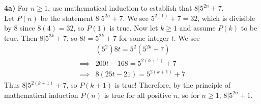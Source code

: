 \documentclass{scrartcl}
\begin{document}
\textbf{4a)} For $n\ge1$, use mathematical induction to establish that $8|5^{2n}+7$.\\

Let $P(n)$ be the statement $8|5^{2n}+7$. We see $5^{2(1)}+7 = 32$, which is divisible by 8 since $8(4)=32$, so $P(1)$ is true. Now let $k\ge1$ and assume $P(k)$ to be true. Then $8|5^{2k}+7$, so $8t=5^{2k}+7$ for some integer $t$. We see
\begin{align*}
  &(5^2)8t = 5^2\left(5^{2k}+7\right)\\
  \implies &200t - 168 = 5^{2(k+1)}+7\\
  \implies &8\left(25t - 21\right) = 5^{2(k+1)}+7
\end{align*}
Thus $8|5^{2(k+1)}+7$, so $P(k+1)$ is true! Therefore, by the principle of mathematical induction $P(n)$ is true for all positive $n$, so for $n\ge1$, $8|5^{2n}+1$.
\end{document}
